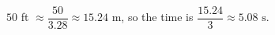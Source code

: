 $50$ ft $\approx\dfrac{50}{3.28}\approx15.24$ m, so the time is $\dfrac{15.24}{3}\approx\boxed{5.08\text{ s}}$.
